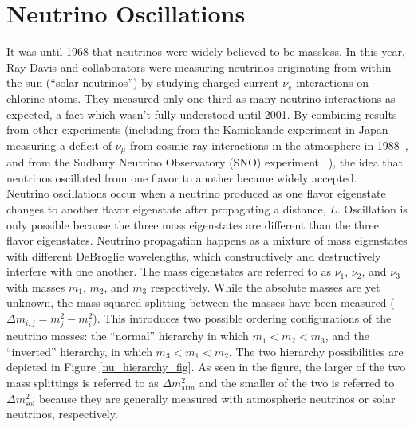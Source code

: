 \section{Neutrino Oscillations}
It was until 1968 that neutrinos were widely believed to be massless. In this year, Ray Davis and collaborators were measuring neutrinos originating from within the sun (``solar neutrinos'') by studying charged-current $\nu_e$ interactions on chlorine atoms. They measured only one third as many neutrino interactions as expected, a fact which wasn't fully understood until 2001. By combining results from other experiments (including from the Kamiokande experiment in Japan measuring a deficit of $\nu_\mu$ from cosmic ray interactions in the atmosphere in 1988~\cite{KamiokandeOscsource}, and from the Sudbury Neutrino Observatory (SNO) experiment ~\cite{SNOOscsource}), the idea that neutrinos oscillated from one flavor to another became widely accepted.\\

Neutrino oscillations occur when a neutrino produced as one flavor eigenstate changes to another flavor eigenstate after propagating a distance, $L$. Oscillation is only possible because the three mass eigenstates are different than the three flavor eigenstates. Neutrino propagation happens as a mixture of mass eigenstates with different DeBroglie wavelengths, which constructively and destructively interfere with one another. The mass eigenstates are referred to as $\nu_1$, $\nu_2$, and $\nu_3$ with masses $m_1$, $m_2$, and $m_3$ respectively. While the absolute masses are yet unknown, the mass-squared splitting between the masses have been measured ($\Delta m_{i,j} = m_j^2-m_i^2$). This introduces two possible ordering configurations of the neutrino masses: the ``normal'' hierarchy in which $m_1<m_2<m_3$, and the ``inverted'' hierarchy, in which $m_3<m_1<m_2$. The two hierarchy possibilities are depicted in Figure \ref{nu_hierarchy_fig}. As seen in the figure, the larger of the two mass splittings is referred to as $\Delta m^2_{\text{atm}}$ and the smaller of the two is referred to $\Delta m^2_{\text{sol}}$ because they are generally measured with atmospheric neutrinos or solar neutrinos, respectively.\\

